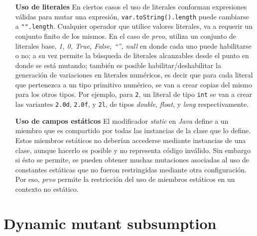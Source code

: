 \begin{enumerate}[leftmargin=.75cm,align=left]
	\item[\textbf{Uso de literales}] En ciertos casos el uso de literales conforman expresiones v\'alidas para mutar una expresi\'on, \lstinline|var.toString().length| puede cambiarse a \lstinline|"".length|. Cualquier operador que utilice valores literales, va a requerir un conjunto finito de los mismos. En el caso de \emph{prvo}, utiliza un conjunto de literales base, \emph{1, 0, True, False, ``'', null} en donde cada uno puede habilitarse o no; a su vez permite la b\'usqueda de literales alcanzables desde el punto en donde se est\'a mutando; tambi\'en es posible habilitar/deshabilitar la generaci\'on de variaciones en literales num\'ericos, es decir que para cada literal que pertenezca a un tipo primitivo num\'erico, se van a crear copias del mismo para los otros tipos. Por ejemplo, para \texttt{2}, un literal de tipo \texttt{int} se van a crear las variantes \texttt{2.0d}, \texttt{2.0f}, y \texttt{2l}, de tipos \emph{double}, \emph{float}, y \emph{long} respectivamente.
	
	\item[\textbf{Uso de campos est\'aticos}] El modificador \emph{static} en \emph{Java} define a un miembro que es compartido por todas las instancias de la clase que lo define. Estos miembros est\'aticos no deber\'ian accederse mediante instancias de una clase, aunque hacerlo es posible y no representa c\'odigo inv\'alido. Sin embargo si \'esto se permite, se pueden obtener muchas mutaciones asociadas al uso de constantes est\'aticas que no fueron restringidas mediante otra configuraci\'on. Por eso, \emph{prvo} permite la restricci\'on del uso de miembros est\'aticos en un contexto no est\'atico.
\end{enumerate}

\section{Dynamic mutant subsumption}
\label{sec:implementation.dynamicSubsumption}

